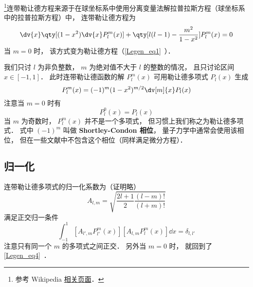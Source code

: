 

\footnote{参考 Wikipedia \href{https://en.wikipedia.org/wiki/Associated_Legendre_polynomials}{相关页面}．}连带勒让德方程来源于在球坐标系中使用分离变量法解拉普拉斯方程（球坐标系中的拉普拉斯方程）中， 连带勒让德方程为
\begin{equation}
\dv{x} \qty[(1-x^2)\dv{x} P_l^m(x)] + \qty[l(l-1) - \frac{m^2}{1-x^2}]P_l^m(x) = 0
\end{equation}
当 $m = 0$ 时， 该方式变为勒让德方程（\autoref{Legen_eq1}~）．

我们只讨 $l$ 为非负整数， $m$ 为绝对值不大于 $l$ 的整数的情况， 且只讨论区间 $x\in [-1,1]$． 此时连带勒让德函数的解 $P_l^m(x)$ 可用勒让德多项式 $P_l(x)$ 生成
\begin{equation}\label{AsLgdr_eq1}
P_l^m(x) = (-1)^m (1 - x^2)^{m/2} \dv[m]{x} P_l(x)
\end{equation}
注意当 $m = 0$ 时有
\begin{equation}
P_l^0(x) = P_l(x)
\end{equation}
当 $m$ 为奇数时， $P_l^m(x)$ 并不是一个多项式， 但习惯上我们称之为勒让德多项式． 式中 $(-1)^m$ 叫做 \textbf{Shortley-Condon 相位}， 量子力学中通常会使用该相位， 但在一些文献中不包含这个相位（同样满足微分方程）．

\subsection{归一化}
连带勒让德多项式的归一化系数为（证明略）
\begin{equation}\label{AsLgdr_eq3}
A_{l,m} = \sqrt{\frac{2l+1}{2}\frac{(l-m)!}{(l+m)!}}
\end{equation}
满足正交归一条件
\begin{equation}\label{AsLgdr_eq4}
\int_{-1}^1 [A_{l',m} P_{l'}^{m}(x)] [A_{l,m} P_l^{m}(x)] \dd{x} = \delta_{l,l'}
\end{equation}
注意只有同一个 $m$ 的多项式之间正交． 另外当 $m = 0$ 时， 就回到了\autoref{Legen_eq4}~．

